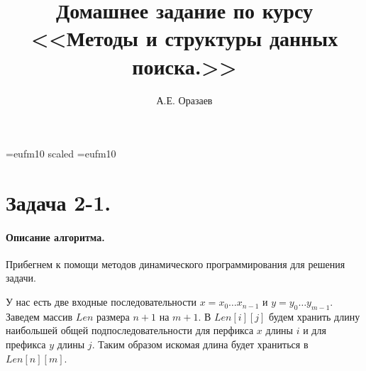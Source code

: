\documentclass[12pt]{article}
\title{\bf Домашнее задание по курсу \\ <<Методы
и структуры данных поиска.>>}
\author{А.Е. Оразаев}
\date{}
\begin{document}
\voffset=-20mm 
\hoffset=-12mm
\font\Got=eufm10 scaled \font\Got=eufm10

\maketitle

\section{Задача 2-1.}
\paragraph{Описание алгоритма.}
Прибегнем к помощи методов динамического программирования для решения задачи.

У нас есть две входные последовательности $ x = x_0 \dots x_{n - 1} $ и
$ y = y_0 \dots y_{m - 1} $. Заведем массив $ Len $ размера $ n + 1 $ на
$ m + 1 $. В $ Len[i][j] $ будем хранить длину наибольшей общей 
подпоследовательности для перфикса $ x $ длины $ i $ и для префикса $ y $
длины $ j $. Таким образом искомая длина будет храниться в $ Len[n][m] $.
\end{document}

